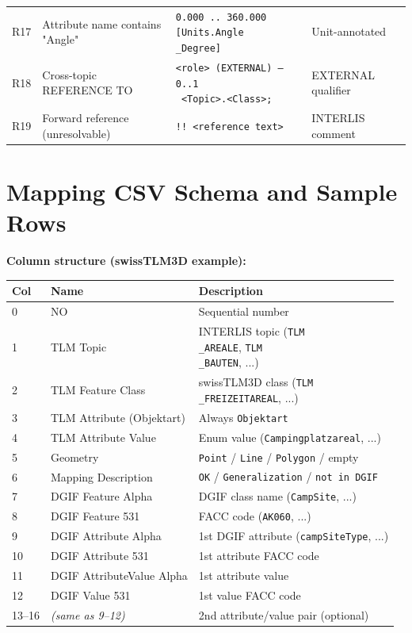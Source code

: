 \documentclass[conference]{IEEEtran}
\begin{document}
\begin{center}
\begin{longtable}{p{}p{}p{}p{}}
R17 & Attribute name contains "Angle" & \texttt{0.000 .. 360.000 [Units.Angle\\_Degree]} & Unit-annotated \\
R18 & Cross-topic REFERENCE TO & \texttt{<role> (EXTERNAL) -- \\{0..1\\} <Topic>.<Class>;} & EXTERNAL qualifier \\
R19 & Forward reference (unresolvable) & \texttt{!! <reference text>} & INTERLIS comment \\
\end{longtable}
\end{center}




\section{Mapping CSV Schema and Sample Rows}

\textbf{Column structure (swissTLM3D example):}

\begin{center}
\begin{longtable}{p{}p{}p{}}
Col & Name & Description \\
\midrule
0 & NO & Sequential number \\
1 & TLM Topic & INTERLIS topic (\texttt{TLM\\_AREALE}, \texttt{TLM\\_BAUTEN}, ...) \\
2 & TLM Feature Class & swissTLM3D class (\texttt{TLM\\_FREIZEITAREAL}, ...) \\
3 & TLM Attribute (Objektart) & Always \texttt{Objektart} \\
4 & TLM Attribute Value & Enum value (\texttt{Campingplatzareal}, ...) \\
5 & Geometry & \texttt{Point} / \texttt{Line} / \texttt{Polygon} / empty \\
6 & Mapping Description & \texttt{OK} / \texttt{Generalization} / \texttt{not in DGIF} \\
7 & DGIF Feature Alpha & DGIF class name (\texttt{CampSite}, ...) \\
8 & DGIF Feature 531 & FACC code (\texttt{AK060}, ...) \\
9 & DGIF Attribute Alpha & 1st DGIF attribute (\texttt{campSiteType}, ...) \\
10 & DGIF Attribute 531 & 1st attribute FACC code \\
11 & DGIF AttributeValue Alpha & 1st attribute value \\
12 & DGIF Value 531 & 1st value FACC code \\
13–16 & \textit{(same as 9–12)} & 2nd attribute/value pair (optional) \\
\end{longtable}
\end{center}
\end{document}

